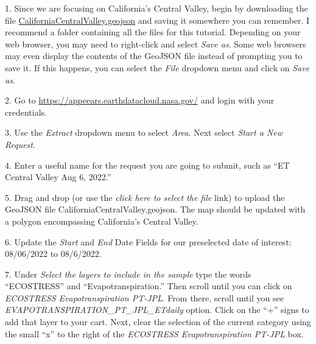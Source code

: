 \documentclass[oneside,a4paper,11pt,explicit]{book}
\begin{document}
1. Since we are focusing on California's Central Valley, begin by downloading the file \href{https://jeremydforsythe.github.io/icecream-tutorials/Tutorial8_Evaportranspiration/CaliforniaCentralValley.geojson}{CaliforniaCentralValley.geojson} and saving it somewhere you can remember. I recommend a folder containing all the files for this tutorial. Depending on your web browser, you may need to right-click and select \textit{Save as}. Some web browsers may even display the contents of the GeoJSON file instead of prompting you to save it. If this happens, you can select the \textit{File} dropdown menu and click on \textit{Save as}. 


2. Go to \href{https://appeears.earthdatacloud.nasa.gov/}{https://appeears.earthdatacloud.nasa.gov/} and login with your credentials. 

3. Use the \textit{Extract} dropdown menu to select \textit{Area}. Next select \textit{Start a New Request}. 

4. Enter a useful name for the request you are going to submit, such as ``ET Central Valley Aug 6, 2022.'' 

5. Drag and drop (or use the \textit{click here to select the file} link) to upload the GeoJSON file CaliforniaCentralValley.geojson. The map should be updated with a polygon encompassing California's Central Valley.

6. Update the \textit{Start} and \textit{End} Date Fields for our preselected date of interest: 08/06/2022 to 08/6/2022.

7. Under \textit{Select the layers to include in the sample} type the words ``ECOSTRESS'' and ``Evapotranspiration.'' Then scroll until you can click on \textit{ECOSTRESS Evapotranspiration PT-JPL}. From there, scroll until you see \textit{EVAPOTRANSPIRATION\_PT\_JPL\_ETdaily} option. Click on the ``+'' signs to add that layer to your cart. Next, clear the selection of the current category using the small ``x'' to the right of the \textit{ECOSTRESS Evapotranspiration PT-JPL} box.
\end{document}
